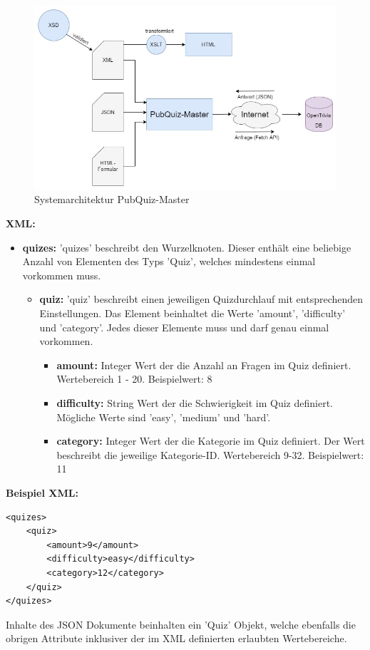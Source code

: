 \documentclass[a4paper]{article}
\begin{document}
\begin{figure}[h]
    \centering
    \includegraphics[scale=0.5]{figures/PubQuizMaster4.jpg}
    \caption{Systemarchitektur PubQuiz-Master}
    \label{fig:my_label}
\end{figure}



\textbf{XML:}

\begin{itemize}
  \item \textbf{quizes:} 'quizes' beschreibt den Wurzelknoten. Dieser enthält eine beliebige Anzahl von Elementen des Typs 'Quiz', welches mindestens einmal vorkommen muss.
  \begin{itemize}
  \item \textbf{quiz:} 'quiz' beschreibt einen jeweiligen Quizdurchlauf mit entsprechenden Einstellungen. Das Element beinhaltet die Werte 'amount', 'difficulty' und 'category'. Jedes dieser Elemente muss und darf genau einmal vorkommen.
   \begin{itemize}
  \item \textbf{amount:} Integer Wert der die Anzahl an Fragen im Quiz definiert. Wertebereich 1 - 20. Beispielwert: 8
   \item \textbf{difficulty:} String Wert der die Schwierigkeit im Quiz definiert. Mögliche Werte sind 'easy', 'medium' und 'hard'.
      \item \textbf{category:} Integer Wert der die Kategorie im Quiz definiert. Der Wert beschreibt die jeweilige Kategorie-ID. Wertebereich 9-32. Beispielwert: 11
\end{itemize}
  
\end{itemize}
\end{itemize}
\textbf{Beispiel XML:}
\begin{verbatim}
<quizes>
    <quiz>
        <amount>9</amount>
        <difficulty>easy</difficulty>
        <category>12</category>
    </quiz>
</quizes>
\end{verbatim}
\vspace{0.5cm}
\hspace{-0.51cm}Inhalte des JSON Dokumente beinhalten ein 'Quiz' Objekt, welche ebenfalls die obrigen Attribute inklusiver der im XML definierten erlaubten Wertebereiche.\vspace{0.5cm}
\end{document}
